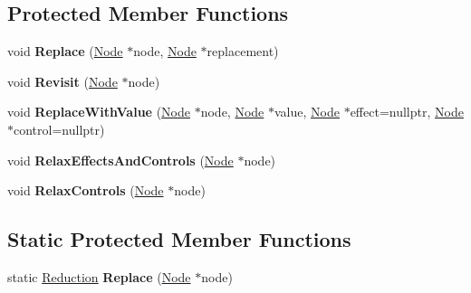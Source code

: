 \subsection*{Protected Member Functions}
\begin{DoxyCompactItemize}
\item 
void {\bfseries Replace} (\hyperlink{classv8_1_1internal_1_1compiler_1_1_node}{Node} $\ast$node, \hyperlink{classv8_1_1internal_1_1compiler_1_1_node}{Node} $\ast$replacement)\hypertarget{classv8_1_1internal_1_1compiler_1_1_advanced_reducer_a375f732a84655a28f171351dc76f8acc}{}\label{classv8_1_1internal_1_1compiler_1_1_advanced_reducer_a375f732a84655a28f171351dc76f8acc}

\item 
void {\bfseries Revisit} (\hyperlink{classv8_1_1internal_1_1compiler_1_1_node}{Node} $\ast$node)\hypertarget{classv8_1_1internal_1_1compiler_1_1_advanced_reducer_a64cae7699553789a4534c549c9170816}{}\label{classv8_1_1internal_1_1compiler_1_1_advanced_reducer_a64cae7699553789a4534c549c9170816}

\item 
void {\bfseries Replace\+With\+Value} (\hyperlink{classv8_1_1internal_1_1compiler_1_1_node}{Node} $\ast$node, \hyperlink{classv8_1_1internal_1_1compiler_1_1_node}{Node} $\ast$value, \hyperlink{classv8_1_1internal_1_1compiler_1_1_node}{Node} $\ast$effect=nullptr, \hyperlink{classv8_1_1internal_1_1compiler_1_1_node}{Node} $\ast$control=nullptr)\hypertarget{classv8_1_1internal_1_1compiler_1_1_advanced_reducer_a2573497dc120509db4c00a28d8d3a9cb}{}\label{classv8_1_1internal_1_1compiler_1_1_advanced_reducer_a2573497dc120509db4c00a28d8d3a9cb}

\item 
void {\bfseries Relax\+Effects\+And\+Controls} (\hyperlink{classv8_1_1internal_1_1compiler_1_1_node}{Node} $\ast$node)\hypertarget{classv8_1_1internal_1_1compiler_1_1_advanced_reducer_a2f1059b277571c651117544bd023cb8c}{}\label{classv8_1_1internal_1_1compiler_1_1_advanced_reducer_a2f1059b277571c651117544bd023cb8c}

\item 
void {\bfseries Relax\+Controls} (\hyperlink{classv8_1_1internal_1_1compiler_1_1_node}{Node} $\ast$node)\hypertarget{classv8_1_1internal_1_1compiler_1_1_advanced_reducer_a69dd3891050d9e54a9b82db9bd55eacc}{}\label{classv8_1_1internal_1_1compiler_1_1_advanced_reducer_a69dd3891050d9e54a9b82db9bd55eacc}

\end{DoxyCompactItemize}
\subsection*{Static Protected Member Functions}
\begin{DoxyCompactItemize}
\item 
static \hyperlink{classv8_1_1internal_1_1compiler_1_1_reduction}{Reduction} {\bfseries Replace} (\hyperlink{classv8_1_1internal_1_1compiler_1_1_node}{Node} $\ast$node)\hypertarget{classv8_1_1internal_1_1compiler_1_1_advanced_reducer_a6b9e69978e8440e00ca157d8e4fef297}{}\label{classv8_1_1internal_1_1compiler_1_1_advanced_reducer_a6b9e69978e8440e00ca157d8e4fef297}

\end{DoxyCompactItemize}
